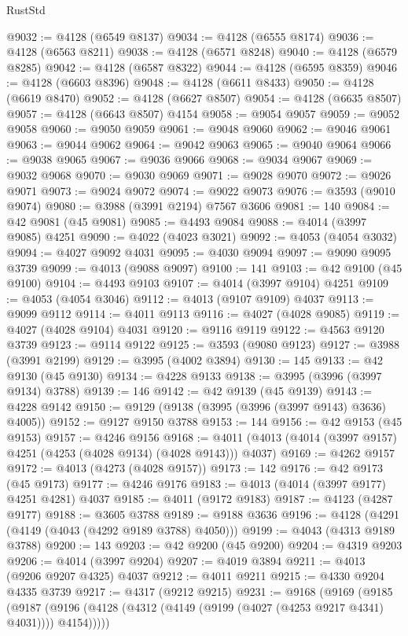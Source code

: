 \begin{lexlean}{RustStd}
\begin{coremodule}
@9032 := @4128 (@6549 @8137)
@9034 := @4128 (@6555 @8174)
@9036 := @4128 (@6563 @8211)
@9038 := @4128 (@6571 @8248)
@9040 := @4128 (@6579 @8285)
@9042 := @4128 (@6587 @8322)
@9044 := @4128 (@6595 @8359)
@9046 := @4128 (@6603 @8396)
@9048 := @4128 (@6611 @8433)
@9050 := @4128 (@6619 @8470)
@9052 := @4128 (@6627 @8507)
@9054 := @4128 (@6635 @8507)
@9057 := @4128 (@6643 @8507) @4154
@9058 := @9054 @9057
@9059 := @9052 @9058
@9060 := @9050 @9059
@9061 := @9048 @9060
@9062 := @9046 @9061
@9063 := @9044 @9062
@9064 := @9042 @9063
@9065 := @9040 @9064
@9066 := @9038 @9065
@9067 := @9036 @9066
@9068 := @9034 @9067
@9069 := @9032 @9068
@9070 := @9030 @9069
@9071 := @9028 @9070
@9072 := @9026 @9071
@9073 := @9024 @9072
@9074 := @9022 @9073
@9076 := @3593 (@9010 @9074)
@9080 := @3988 (@3991 @2194) @7567 @3606
@9081 := 140
@9084 := @42 @9081 (@45 @9081)
@9085 := @4493 @9084
@9088 := @4014 (@3997 @9085) @4251
@9090 := @4022 (@4023 @3021)
@9092 := @4053 (@4054 @3032)
@9094 := @4027 @9092 @4031
@9095 := @4030 @9094
@9097 := @9090 @9095 @3739
@9099 := @4013 (@9088 @9097)
@9100 := 141
@9103 := @42 @9100 (@45 @9100)
@9104 := @4493 @9103
@9107 := @4014 (@3997 @9104) @4251
@9109 := @4053 (@4054 @3046)
@9112 := @4013 (@9107 @9109) @4037
@9113 := @9099 @9112
@9114 := @4011 @9113
@9116 := @4027 (@4028 @9085)
@9119 := @4027 (@4028 @9104) @4031
@9120 := @9116 @9119
@9122 := @4563 @9120 @3739
@9123 := @9114 @9122
@9125 := @3593 (@9080 @9123)
@9127 := @3988 (@3991 @2199)
@9129 := @3995 (@4002 @3894)
@9130 := 145
@9133 := @42 @9130 (@45 @9130)
@9134 := @4228 @9133
@9138 := @3995 (@3996 (@3997 @9134) @3788)
@9139 := 146
@9142 := @42 @9139 (@45 @9139)
@9143 := @4228 @9142
@9150 := @9129 (@9138 (@3995 (@3996 (@3997 @9143) @3636) @4005))
@9152 := @9127 @9150 @3788
@9153 := 144
@9156 := @42 @9153 (@45 @9153)
@9157 := @4246 @9156
@9168 := @4011 (@4013 (@4014 (@3997 @9157) @4251 (@4253 (@4028 @9134) (@4028 @9143))) @4037)
@9169 := @4262 @9157
@9172 := @4013 (@4273 (@4028 @9157))
@9173 := 142
@9176 := @42 @9173 (@45 @9173)
@9177 := @4246 @9176
@9183 := @4013 (@4014 (@3997 @9177) @4251 @4281) @4037
@9185 := @4011 (@9172 @9183)
@9187 := @4123 (@4287 @9177)
@9188 := @3605 @3788
@9189 := @9188 @3636
@9196 := @4128 (@4291 (@4149 (@4043 (@4292 @9189 @3788) @4050)))
@9199 := @4043 (@4313 @9189 @3788)
@9200 := 143
@9203 := @42 @9200 (@45 @9200)
@9204 := @4319 @9203
@9206 := @4014 (@3997 @9204)
@9207 := @4019 @3894
@9211 := @4013 (@9206 @9207 @4325) @4037
@9212 := @4011 @9211
@9215 := @4330 @9204 @4335 @3739
@9217 := @4317 (@9212 @9215)
@9231 := @9168
    (@9169
      (@9185
        (@9187 (@9196 (@4128 (@4312 (@4149 (@9199 (@4027 (@4253 @9217 @4341) @4031)))) @4154)))))

\end{coremodule}
\end{lexlean}
